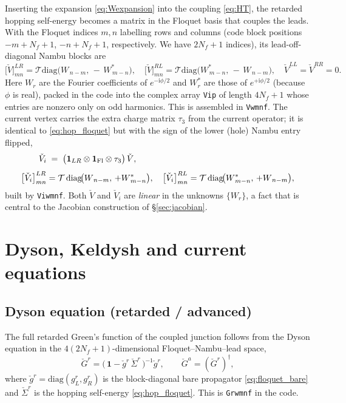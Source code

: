 \documentclass[11pt,a4paper]{article}
\newcommand{\id}{\mathbf{1}}          %
\newcommand{\ii}{\mathrm{i}}
\newcommand{\gr}{\check{g}}            %
\newcommand{\Gr}{\check{G}}            %
\newcommand{\Sig}{\check{\Sigma}}      %
\begin{document}
Inserting the expansion \eqref{eq:Wexpansion} into the coupling \eqref{eq:HT},
the retarded hopping self-energy becomes a matrix in the Floquet basis that couples 
the leads. With the Floquet indices $m,n$ labelling rows and columns (code block 
positions $-m+N_f+1$, $-n+N_f+1$, respectively. We have $2N_f+1$ indices), its 
lead-off-diagonal Nambu blocks are
\begin{equation}
  \bigl[\check V\bigr]^{LR}_{mn} =
  \mathcal{T}
  \mathrm{diag}\!\big(W_{\,n-m},\,-\,W^{*}_{\,m-n}\big),
  \quad
  \bigl[\check V\bigr]^{RL}_{mn} =
  \mathcal{T}
  \mathrm{diag}\!\big(W^{*}_{\,m-n},\,-\,W_{\,n-m}\big),
  \quad
  \check V^{LL}=\check V^{RR}=0 .
  \label{eq:hop_floquet}
\end{equation}
Here $W_r$ are the Fourier coefficients of $e^{-\ii\phi/2}$ and $W^*_{r}$ are 
those of $e^{+\ii\phi/2}$ (because $\phi$ is real), packed in the code into the 
complex array \texttt{Vip} of length $4N_f+1$ whose entries are nonzero only on 
odd harmonics.  This is assembled in \texttt{Vwmnf}.  The current vertex carries 
the extra charge matrix $\tau_3$ from the current operator; it is identical to 
\eqref{eq:hop_floquet} but with the sign of the lower (hole) Nambu entry flipped,
\begin{equation}
  \begin{aligned}
  \check V_i &\;=\; \big(\id_{LR}\otimes\id_{\rm Fl}\otimes\tau_3\big)\,\check V ,\\[4pt]
  \bigl[\check V_i\bigr]^{LR}_{mn} &= \mathcal{T}\,\mathrm{diag}\!\big(W_{\,n-m},\,+W^{*}_{\,m-n}\big),
  \quad
  \bigl[\check V_i\bigr]^{RL}_{mn} = \mathcal{T}\,\mathrm{diag}\!\big(W^{*}_{\,m-n},\,+W_{\,n-m}\big),
  \end{aligned}
  \label{eq:hop_vertex}
\end{equation}
built by \texttt{Viwmnf}. Both $\check V$ and $\check V_i$ are \emph{linear} in
the unknowns $\{W_r\}$, a fact that is central to the Jacobian construction
of \S\ref{sec:jacobian}.

\section{Dyson, Keldysh and current equations}
\label{sec:dyson}

\subsection{Dyson equation (retarded / advanced)}

The full retarded Green's function of the coupled junction follows from the
Dyson equation in the $4(2N_f+1)$-dimensional Floquet--Nambu--lead space,
\begin{equation}
  \Gr^r = \bigl(\,\id - \gr^r\,\Sig^r\,\bigr)^{-1}\gr^r,
  \qquad
  \Gr^a = (\Gr^r)^\dagger,
  \label{eq:dyson}
\end{equation}
where $\gr^r=\mathrm{diag}(g^r_L,g^r_R)$ is the block-diagonal bare propagator
\eqref{eq:floquet_bare} and $\Sig^r$ is the hopping self-energy
\eqref{eq:hop_floquet}.  This is \texttt{Grwmnf} in the code.
\end{document}
